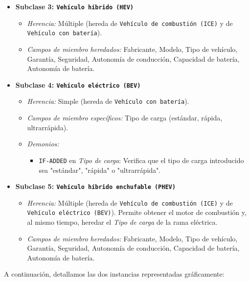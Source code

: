 \documentclass[11pt, a4paper]{article}
\newenvironment{problem}[1][Cuestión]{
	\vspace{0.5cm}
	\noindent{\Large\bfseries #1} \par\vspace{0.5cm}
}{
	\vspace{0.5cm}
}
\begin{document}
\begin{problem}[Problema 1 (40 \%)]
\begin{enumerate}[label=\alph*)]
{\begin{itemize}
					\item \textbf{Subclase 3: \texttt{Vehículo híbrido (HEV)}}
						\begin{itemize}
							\item \textit{Herencia:} Múltiple (hereda de \texttt{Vehículo de combustión (ICE)} y de \texttt{Vehículo con batería}).
							\item \textit{Campos de miembro heredados:} Fabricante, Modelo, Tipo de vehículo, Garantía, Seguridad, Autonomía de conducción, Capacidad de batería, Autonomía de batería.
						\end{itemize}

					\item \textbf{Subclase 4: \texttt{Vehículo eléctrico (BEV)}}
						\begin{itemize}
							\item \textit{Herencia:} Simple (hereda de \texttt{Vehículo con batería}).
							\item \textit{Campos de miembro específicos:} Tipo de carga (estándar, rápida, ultrarrápida).
							\item \textit{Demonios:}
								\begin{itemize}
									\item \texttt{IF-ADDED} en \textit{Tipo de carga}: Verifica que el tipo de carga introducido sea "estándar", "rápida" o "ultrarrápida".  
								\end{itemize}
						\end{itemize}

					\item \textbf{Subclase 5: \texttt{Vehículo híbrido enchufable (PHEV)}}
						\begin{itemize}
							\item \textit{Herencia:} Múltiple (hereda de \texttt{Vehículo de combustión (ICE)} y de \texttt{Vehículo eléctrico (BEV)}). Permite obtener el motor de combustión y, al mismo tiempo, heredar el \textit{Tipo de carga} de la rama eléctrica.
							\item \textit{Campos de miembro heredados:} Fabricante, Modelo, Tipo de vehículo, Garantía, Seguridad, Autonomía de conducción, Capacidad de batería, Autonomía de batería.
						\end{itemize}
				\end{itemize}

				A continuación, detallamos las dos instancias representadas gráficamente:

}
\end{enumerate}
\end{problem}
\end{document}
